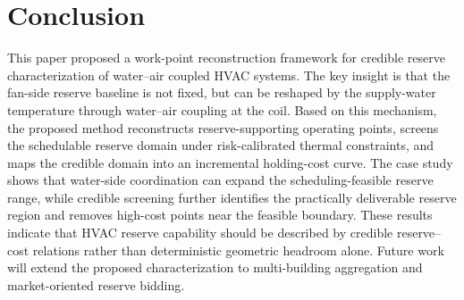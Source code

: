 \documentclass[journal]{IEEEtran}
\theoremstyle{remark}
\begin{document}





\section{Conclusion}
\label{sec:conclusion}

This paper proposed a work-point reconstruction framework for credible reserve characterization of water--air coupled HVAC systems. The key insight is that the fan-side reserve baseline is not fixed, but can be reshaped by the supply-water temperature through water--air coupling at the coil. Based on this mechanism, the proposed method reconstructs reserve-supporting operating points, screens the schedulable reserve domain under risk-calibrated thermal constraints, and maps the credible domain into an incremental holding-cost curve. The case study shows that water-side coordination can expand the scheduling-feasible reserve range, while credible screening further identifies the practically deliverable reserve region and removes high-cost points near the feasible boundary. These results indicate that HVAC reserve capability should be described by credible reserve--cost relations rather than deterministic geometric headroom alone. Future work will extend the proposed characterization to multi-building aggregation and market-oriented reserve bidding.
\end{document}
